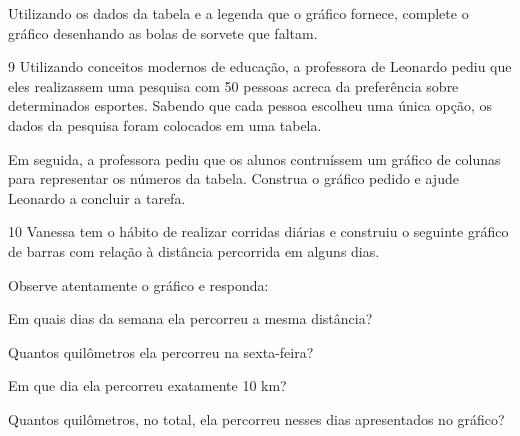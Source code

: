 {Utilizando os dados da tabela e a legenda que o gráfico fornece,
complete o gráfico desenhando as bolas de sorvete que faltam.


\num{9} Utilizando conceitos modernos de educação, a professora de Leonardo
pediu que eles realizassem uma pesquisa com 50 pessoas acreca da
preferência sobre determinados esportes. Sabendo que cada pessoa
escolheu uma única opção, os dados da pesquisa foram colocados em uma tabela.


Em seguida, a professora pediu que os alunos contruíssem um gráfico de
colunas para representar os números da tabela. Construa o gráfico pedido
e ajude Leonardo a concluir a tarefa.


\num{10} Vanessa tem o hábito de realizar corridas diárias e construiu o
seguinte gráfico de barras com relação à distância percorrida em alguns dias.


Observe atentamente o gráfico e responda:

\begin{escolha}
\item
  Em quais dias da semana ela percorreu a mesma distância?


\item
  Quantos quilômetros ela percorreu na sexta-feira?


\item
  Em que dia ela percorreu exatamente 10 km?


\item
  Quantos quilômetros, no total, ela percorreu nesses dias apresentados no gráfico?

\end{escolha}

}
